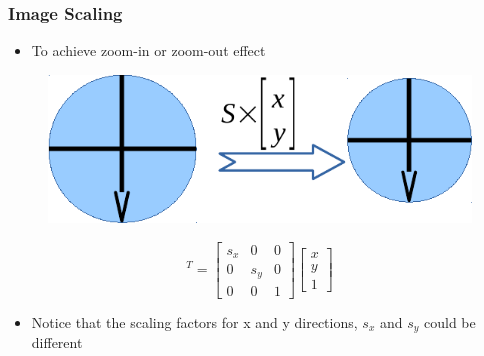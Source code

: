\begin{frame}
\frametitle {Image Scaling}
\begin{itemize}
	\item {To achieve zoom-in or zoom-out effect}
\end{itemize}
\vspace{0.1in}
\begin{figure}
	{\includegraphics[width=0.6\linewidth]{./figs/imgtrans_scale.pdf}}
\end{figure}
\begin{equation}
	[x'~~y'~~1]^T= \left[ \begin{array}{ccc}
	s_x & 0 & 0 \\
	0 & s_y & 0 \\
	0 & 0 & 1 
	\end{array} \right] \left[ \begin{array}{c}
	x \\
	y \\
	1
	\end{array} \right]
\end{equation}
\begin{itemize}
	\item {Notice that the scaling factors for x and y directions, $s_x$ and $s_y$ could be different}
\end{itemize}
\end{frame}

